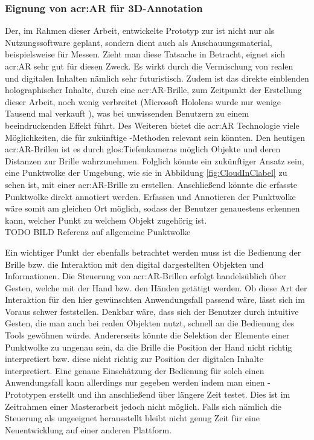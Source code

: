 \subsubsection{Eignung von \acrlong{acr:AR} für 3D-Annotation}
Der, im Rahmen dieser Arbeit, entwickelte Prototyp zur  ist nicht nur als Nutzungssoftware geplant, sondern dient auch als Anschauungsmaterial, beispielsweise für Messen. Zieht man diese Tatsache in Betracht, eignet sich \acrlong{acr:AR} sehr gut für diesen Zweck. Es wirkt durch die Vermischung von realen und digitalen Inhalten nämlich sehr futuristisch. Zudem ist das direkte einblenden holographischer Inhalte, durch eine \acrshort{acr:AR}-Brille, zum Zeitpunkt der Erstellung dieser Arbeit, noch wenig verbreitet (Microsoft Hololens wurde nur wenige Tausend mal verkauft \cite{bib:HololensVerkaufszahlen}), was bei unwissenden Benutzern zu einem beeindruckenden Effekt führt. Des Weiteren bietet die \acrlong{acr:AR} Technologie viele Möglichkeiten, die für zukünftige -Methoden relevant sein könnten. Den heutigen \acrshort{acr:AR}-Brillen ist es durch \glspl{glos:Tiefenkamera} möglich Objekte und deren Distanzen zur Brille wahrzunehmen. Folglich könnte ein zukünftiger Ansatz sein, eine Punktwolke der Umgebung, wie sie in Abbildung \ref{fig:CloudInClabel} zu sehen ist, mit einer \acrshort{acr:AR}-Brille zu erstellen. Anschließend könnte die erfasste Punktwolke direkt annotiert werden. Erfassen und Annotieren der Punktwolke wäre somit am gleichen Ort möglich, sodass der Benutzer genauestens erkennen kann, welcher Punkt zu welchem Objekt zugehörig ist.\\ 


TODO BILD Referenz auf allgemeine Punktwolke 

Ein wichtiger Punkt der ebenfalls betrachtet werden muss ist die Bedienung der Brille bzw. die Interaktion mit den digital dargestellten Objekten und Informationen. Die Steuerung von \acrshort{acr:AR}-Brillen erfolgt handelsüblich über Gesten, welche mit der Hand bzw. den Händen getätigt werden. Ob diese Art der Interaktion für den hier gewünschten Anwendungsfall passend wäre, lässt sich im Voraus schwer feststellen. Denkbar wäre, dass sich der Benutzer durch intuitive Gesten, die man auch bei realen Objekten nutzt, schnell an die Bedienung des Tools gewöhnen würde. Andererseits könnte die Selektion der Elemente einer Punktwolke zu ungenau sein, da die Brille die Position der Hand nicht richtig interpretiert bzw. diese nicht richtig zur Position der digitalen Inhalte interpretiert. Eine genaue Einschätzung der Bedienung für solch einen Anwendungsfall kann allerdings nur gegeben werden indem man einen -Prototypen erstellt und ihn anschließend über längere Zeit testet. Dies ist im Zeitrahmen einer Masterarbeit jedoch nicht möglich. Falls sich nämlich die Steuerung als ungeeignet herausstellt bleibt nicht genug Zeit für eine Neuentwicklung auf einer anderen Plattform.\\  

